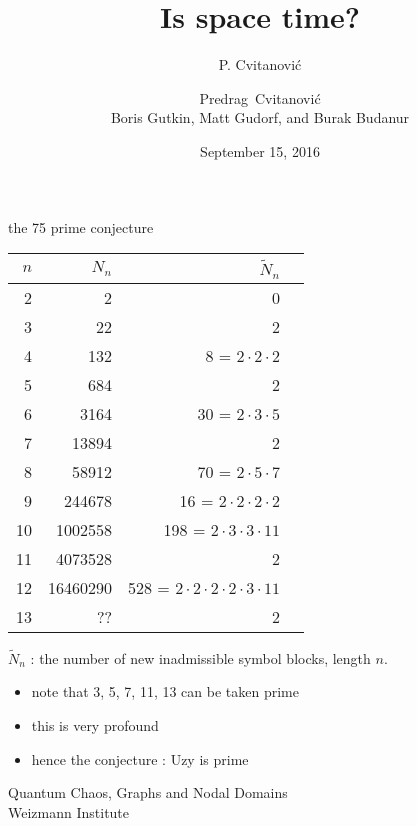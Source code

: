 \begin{frame}{the 75 prime conjecture}
\medskip
{\scriptsize
\begin{center}
\begin{tabular}{r|r|r|l|}
  $n$ & $N_n$ & $\tilde{N}_n$ \\
  \hline
  2 & 2 & 0 \\
  3 & 22 & 2 \\
  4 & 132 & 8 = $2 \cdot 2 \cdot 2$\\
  5 & 684 & 2 \\
  6 & 3164 & 30 = $2 \cdot 3 \cdot 5$\\
  7 & 13894 & 2 \\
  8 & 58912 & 70  = $2 \cdot 5 \cdot 7$\\
  9 & 244678 & 16  = $2 \cdot 2 \cdot 2 \cdot 2$\\
  10 & 1002558 & 198 = $2 \cdot 3 \cdot 3 \cdot 11$ \\
  11 & 4073528 & 2 \\
  12 & 16460290 & 528 = $2 \cdot 2 \cdot 2 \cdot 2 \cdot 3 \cdot 11$\\
  13 & ?? & 2 \\
\end{tabular}
\end{center}
    } %

$\tilde{N}_n$ : the number of new inadmissible symbol blocks, length $n$.
\begin{itemize}
  \item note that 3, 5, 7, 11, 13 can be taken prime
  \item this is very profound
  \item hence the conjecture : Uzy is prime
\end{itemize}
\end{frame}


\title{\huge Is space time?}
\author{P. Cvitanovi\'c}
\author[Cvitanovi\'c]
{
  \textcolor{green!50!black}{
  {Predrag~Cvitanovi\'c \\
  Boris Gutkin,
  Matt Gudorf,
  and
  Burak Budanur
  }	%
  }
}
\institute
{
Quantum Chaos, Graphs and Nodal Domains
\\
                Weizmann Institute
 }
\date{September 15, 2016}

\begin{frame}
  \titlepage
\end{frame}


